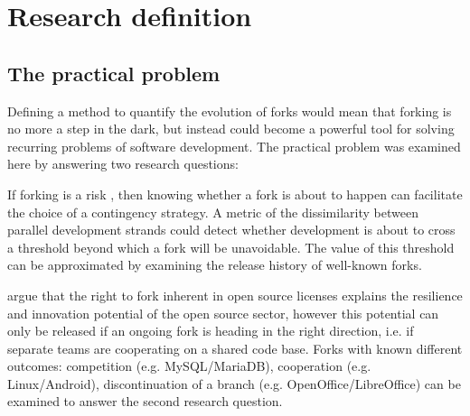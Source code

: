 
\chapter{Research definition} %

\label{Chapter2} %

\section{The practical problem}
\label{the_practical_problem}

Defining a method to quantify the evolution of forks would mean that forking is no more a step in the dark, but instead could become a powerful tool for solving recurring problems of software development. The practical problem was examined here by answering two research questions:


\noindent
If forking is a risk \citep{Kogut2001a}, then knowing whether a fork is about to happen can facilitate the choice of a contingency strategy. A metric of the dissimilarity between parallel development strands could detect whether development is about to cross a threshold beyond which a fork will be unavoidable. The value of this threshold can be approximated by examining the release history of well-known forks.


\noindent
\citet{Nyman2013a} argue that the right to fork inherent in open source licenses explains the resilience and innovation potential of the open source sector, however this potential can only be released if an ongoing fork is heading in the right direction, i.e. if separate teams are cooperating on a shared code base. Forks with known different outcomes: competition (e.g. MySQL/MariaDB), cooperation (e.g. Linux/Android), discontinuation of a branch (e.g. OpenOffice/LibreOffice) can be examined to answer the second research question.


